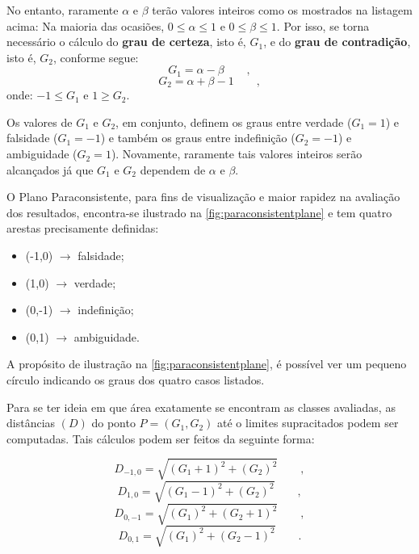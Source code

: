 			\par No entanto, raramente $\alpha$ e $\beta$ terão valores inteiros como os mostrados na listagem acima: Na maioria das ocasiões, $0 \leqslant \alpha \leqslant 1$ e $0 \leqslant \beta \leqslant 1$. Por isso, se torna necessário o cálculo do \textbf{grau de certeza}, isto é, $G_1$, e do \textbf{grau de contradição}, isto é, $G_2$, conforme segue:
			\begin{equation}
				G_1=\alpha-\beta  \qquad,
			\end{equation}
			\begin{equation}
				G_2=\alpha+\beta-1 \qquad,
			\end{equation}
			onde: $-1 \leqslant G_1$ e  $1 \geqslant G_2$.
			
			\par Os valores de $G_1$ e $G_2$, em conjunto, definem os graus entre verdade ($G_1=1$) e falsidade ($G_1=-1$) e também os graus entre indefinição ($G_2=-1$) e ambiguidade ($G_2=1$). Novamente, raramente tais valores inteiros serão alcançados já que $G_1$ e $G_2$ dependem de $\alpha$ e $\beta$.
	
			\par O Plano Paraconsistente, para fins de visualização e maior rapidez na avaliação dos resultados, encontra-se ilustrado na  \autoref{fig:paraconsistentplane} e tem quatro arestas precisamente definidas:
			\begin{itemize}
				\item (-1,0) $\rightarrow$ falsidade;
				\item (1,0) $\rightarrow$ verdade;
				\item (0,-1) $\rightarrow$ indefinição;
				\item (0,1) $\rightarrow$ ambiguidade.
			\end{itemize}
			\par A propósito de ilustração na  \autoref{fig:paraconsistentplane}, é possível ver um pequeno círculo indicando os graus dos quatro casos listados.
			
			\par Para se ter ideia em que área exatamente se encontram as classes avaliadas, as distâncias $(D)$ do ponto $P=(G_1,G_2)$ até o limites supracitados podem ser computadas. Tais cálculos podem ser feitos da seguinte forma:
	
			\begin{equation}
				D_{-1,0}=\sqrt{(G_1+1)^2+(G_2)^2}\qquad,
			\end{equation}
			\begin{equation}
				D_{1,0}=\sqrt{(G_1-1)^2+(G_2)^2}\qquad,
			\end{equation}
			\begin{equation}
				D_{0,-1}=\sqrt{(G_1)^2+(G_2+1)^2}\qquad,		
			\end{equation}
			\begin{equation}
				D_{0,1}=\sqrt{(G_1)^2+(G_2-1)^2}\qquad.
			\end{equation}		
			
